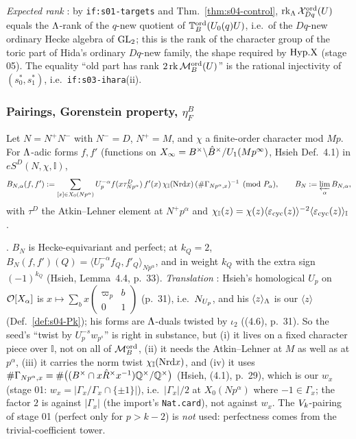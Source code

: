 \noindent\emph{Expected rank} \stexp: by \texttt{if:s01-targets} and Thm.~\ref{thm:s04-control}, $\operatorname{rk}_\Lambda\mathcal{X}^{\mathrm{ord}}_{Dq}(U)$ equals the
$\Lambda$-rank of the $q$-new quotient of $\mathbb{T}^{\mathrm{ord}}_B(U_0(q)U)$, i.e.\ of the $Dq$-new ordinary Hecke algebra of $\mathrm{GL}_2$; this is the
rank of the character group of the toric part of Hida's ordinary $Dq$-new family, the shape required by $\mathrm{Hyp.X}$ (stage 05). The
equality ``old part has rank $2\operatorname{rk}\mathcal{M}^{\mathrm{ord}}_B(U)$'' is the rational injectivity of $(s_0^*,s_1^*)$, i.e.\ \texttt{if:s03-ihara}(ii).

\subsubsection{Pairings, Gorenstein property, $\eta^B_F$}

\begin{definition}\label{def:s04-BN}
Let $N=N^+N^-$ with $N^-=D$, $N^+=M$, and $\chi$ a finite-order character mod $Mp$. For $\Lambda$-adic forms $f,f'$ (functions on
$X_\infty=B^\times\backslash\hat{B}^\times/U_1(Mp^\infty)$, Hsieh Def.~4.1) in $eS^D(N,\chi,\mathbb I)$,
\[B_{N,\alpha}(f,f'):=\sum_{[x]\in X_0(Np^\alpha)}U_p^{-\alpha}f(x\tau^D_{Np^\alpha})\,f'(x)\,\chi_{\mathbb I}(\mathrm{Nrd} x)\,(\#\Gamma_{Np^\alpha,x})^{-1}\pmod{P_\alpha},\qquad
B_N:=\varprojlim_\alpha B_{N,\alpha},\]
with $\tau^D$ the Atkin--Lehner element at $N^+p^\alpha$ and $\chi_{\mathbb I}(z)=\chi(z)\langle\varepsilon_{\rm cyc}(z)\rangle^{-2}\langle\varepsilon_{\rm cyc}(z)\rangle_{\mathbb I}$.
\end{definition}
\noindent\stcited{} . $B_N$ is Hecke-equivariant
and perfect; at $k_Q=2$, $B_N(f,f')(Q)=\langle U_p^{-\alpha}f_Q,f'_Q\rangle_{Np^\alpha}$, and in weight $k_Q$ with the extra sign
$(-1)^{k_Q}$ (Hsieh, Lemma~4.4, p.~33). \emph{Translation} \sttoprove: Hsieh's homological $U_p$ on $\mathcal{O}[X_\alpha]$ is
$x\mapsto\sum_bx\left(\begin{smallmatrix}\varpi_p&b\\0&1\end{smallmatrix}\right)$ (p.~31), i.e.\ $N_{U_p}$, and his $\langle z\rangle_\Lambda$ is our
$\langle z\rangle$ (Def.~\ref{def:s04-Pk}); his forms are $\Lambda$-duals twisted by $\iota_2$ ((4.6), p.~31). So the seed's ``twist by
$U_p^{-s}w_{p^s}$'' is right in substance, but (i) it lives on a fixed character piece over $\mathbb I$, not on all of $\mathcal{M}^{\mathrm{ord}}_B$, (ii) it
needs the Atkin--Lehner at $M$ as well as at $p^\alpha$, (iii) it carries the norm twist $\chi_{\mathbb I}(\mathrm{Nrd} x)$, and (iv) it
uses $\#\Gamma_{Np^\alpha,x}=\#\big((B^\times\cap x\hat R^\times x^{-1})\mathbb{Q}^\times/\mathbb{Q}^\times\big)$ (Hsieh, (4.1), p.~29), which is our $w_x$
(stage 01: $w_x=|\Gamma_x/\Gamma_x\cap\{\pm1\}|$), i.e.\ $|\Gamma_x|/2$ at $X_0(Np^\alpha)$ where $-1\in\Gamma_x$; the factor $2$ is against
$|\Gamma_x|$ (the import's \texttt{Nat.card}), not against $w_x$. The $V_k$-pairing of stage 01
(perfect only for $p>k-2$) is \emph{not} used: perfectness comes from the trivial-coefficient tower.

